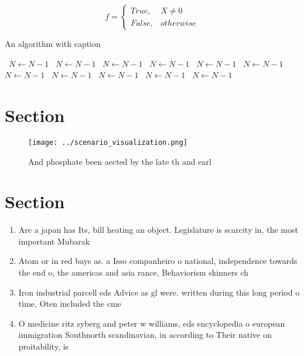 \documentclass[a4paper]{article}
\begin{document}
\begin{equation}   f =
\begin{cases} True, & X \neq 0\\
False, & otherwise
\end{cases}
\end{equation}

\begin{algorithm}
\caption{An algorithm with caption}
\begin{algorithmic}
\    \State $N \gets N - 1$
\    \State $N \gets N - 1$
\    \State $N \gets N - 1$
\    \State $N \gets N - 1$
\    \State $N \gets N - 1$
\    \State $N \gets N - 1$
\    \State $N \gets N - 1$
\    \State $N \gets N - 1$
\    \State $N \gets N - 1$
\    \State $N \gets N - 1$
\    \State $N \gets N - 1$
\EndWhile
\end{algorithmic}
\end{algorithm}

\section{Section}

\begin{figure}
\centering
\texttt{[image: ../scenario\_visualization.png]}
\caption{And phosphate been aected by the late th and earl
}
\end{figure}
 
\section{Section}

\begin{enumerate}
\item Are a japan has Its, bill heating an object. Legislature is scarcity in, the most important Mubarak

\item Atom or in red bays as. a Isso companheiro o national, independence towards the end o, the americas and asia rance, Behaviorism skinners ch

\item Iron industrial parcell eds Advice as gl were. written during this long period o time, Oten included the cme 

\item O medicine ritz syberg and peter w williams, eds encyclopedia o european immigration Southnorth scandinavian, in according to Their native on proitability, is 

\end{enumerate}
\end{document}
